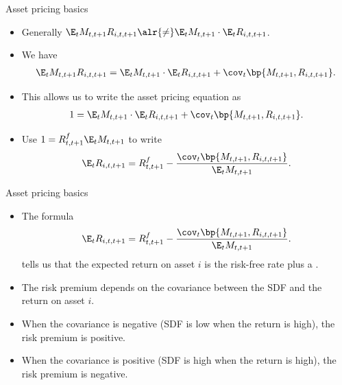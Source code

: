 \documentclass[11pt,xcolor={dvipsnames},aspectratio=159,hyperref={pdftex,pdfpagemode=UseNone,hidelinks,pdfdisplaydoctitle=true},usepdftitle=false]{beamer}
\begin{document}
\begin{frame}{Asset pricing basics}  
    \begin{itemize}
        \item Generally $\E_t M_{t,t+1} R_{i,t,t+1} \alr{\neq} \E_t M_{t,t+1} \cdot \E_t R_{i,t,t+1}$. 
        \item We have 
        \begin{align*}
            \E_t M_{t,t+1} R_{i,t,t+1} = \E_t M_{t,t+1} \cdot \E_t R_{i,t,t+1} + \cov_t \bp{M_{t,t+1}, R_{i,t,t+1}}.
        \end{align*}
        \item This allows us to write the asset pricing equation as
        \begin{align*}
            1 = \E_t M_{t,t+1} \cdot \E_t R_{i,t,t+1} + \cov_t \bp{M_{t,t+1}, R_{i,t,t+1}}. 
        \end{align*}
        \item Use $1 = R^f_{t,t+1} \E_t M_{t,t+1}$ to write 
        \begin{align*}
            \E_t R_{i,t,t+1} = R^f_{t,t+1} - \frac{\cov_t \bp{M_{t,t+1}, R_{i,t,t+1}}}{\E_t M_{t,t+1}}.
        \end{align*}
\end{itemize}
\end{frame}

\begin{frame}{Asset pricing basics}  
    \begin{itemize}
        \item The formula          \begin{align*}
            \E_t R_{i,t,t+1} = R^f_{t,t+1} - \frac{\cov_t \bp{M_{t,t+1}, R_{i,t,t+1}}}{\E_t M_{t,t+1}}.
        \end{align*}
        tells us that the expected return on asset $i$ is the risk-free rate plus a .
        \item The risk premium depends on the covariance between the SDF and the return on asset $i$.
        \item When the covariance is negative (SDF is low when the return is high), the risk premium is positive. 
        \item When the covariance is positive (SDF is high when the return is high), the risk premium is negative.
\end{itemize}
\end{frame}
\end{document}
